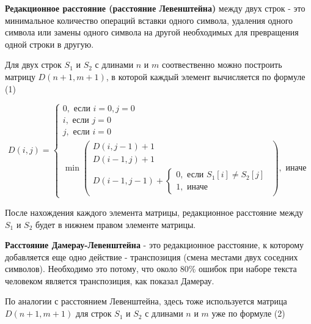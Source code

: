 \documentclass[a4paper,12pt]{article}
\begin{document}
\textbf{Редакционное расстояние (расстояние Левенштейна)}
между двух строк - это
минимальное количество операций вставки одного символа, удаления одного
символа или замены одного символа на другой необходимых для превращения
одной строки в другую. \cite{itmo}

Для двух строк $S_1$ и $S_2$ с длинами $n$ и $m$ соотвественно можно
построить матрицу $D(n+1, m+1)$, в которой каждый элемент вычисляется по формуле (1)
\cite{itmo}

\begin{equation}
D(i,j) =
\begin{cases}
    0, \text{ если } i = 0, j = 0 \\
    i, \text{ если } j = 0 \\
    j, \text{ если } i = 0 \\
    \min
    \left(
        \begin{matrix}
            D(i, j - 1) + 1 \\
            D(i - 1, j) + 1 \\
            D(i - 1, j - 1) +
            \begin{cases}
                0, \text{ если } S_1[i] \ne S_2[j] \\
                1, \text{ иначе}
            \end{cases}
        \end{matrix}
    \right)
    , \text{ иначе}
\end{cases}
\end{equation}

После нахождения каждого элемента матрицы, редакционное расстояние между
$S_1$ и $S_2$ будет в нижнем правом элементе матрицы.

\textbf{Расстояние Дамерау-Левенштейна} - это редакционное расстояние,
к которому добавляется еще одно действие - транспозиция (смена местами
двух соседних символов). Необходимо это потому, что около 80\% ошибок
при наборе текста человеком является транспозиция, как показал Дамерау. \cite{bmstu}

По аналогии с расстоянием Левенштейна, здесь тоже используется матрица
$D(n+1, m+1)$ для строк $S_1$ и $S_2$ с длинами $n$ и $m$ уже по формуле (2)
\cite{bmstu}
\end{document}

